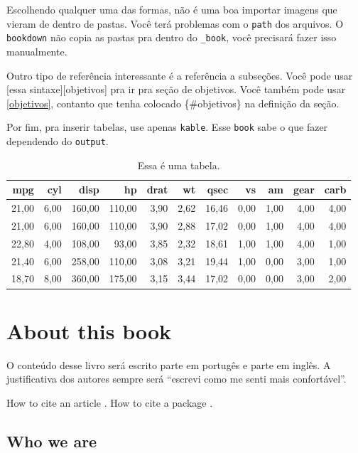 \documentclass[]{report}
\theoremstyle{definition}
\theoremstyle{definition}
\theoremstyle{definition}
\theoremstyle{remark}
\begin{document}
Escolhendo qualquer uma das formas, não é uma boa importar imagens que
vieram de dentro de pastas. Você terá problemas com o \texttt{path} dos
arquivos. O \texttt{bookdown} não copia as pastas pra dentro do
\texttt{\_book}, você precisará fazer isso manualmente.

Outro tipo de referência interessante é a referência a subseções. Você
pode usar {[}essa sintaxe{]}{[}objetivos{]} pra ir pra seção de
objetivos. Você também pode usar \ref{objetivos}, contanto que tenha
colocado \{\#objetivos\} na definição da seção.

Por fim, pra inserir tabelas, use apenas \texttt{kable}. Esse
\texttt{book} sabe o que fazer dependendo do \texttt{output}.

\begin{table}[H]
\centering
\begin{tabular}{rrrrrrrrrrr}
  \hline
mpg & cyl & disp & hp & drat & wt & qsec & vs & am & gear & carb \\ 
  \hline
21,00 & 6,00 & 160,00 & 110,00 & 3,90 & 2,62 & 16,46 & 0,00 & 1,00 & 4,00 & 4,00 \\ 
  21,00 & 6,00 & 160,00 & 110,00 & 3,90 & 2,88 & 17,02 & 0,00 & 1,00 & 4,00 & 4,00 \\ 
  22,80 & 4,00 & 108,00 & 93,00 & 3,85 & 2,32 & 18,61 & 1,00 & 1,00 & 4,00 & 1,00 \\ 
  21,40 & 6,00 & 258,00 & 110,00 & 3,08 & 3,21 & 19,44 & 1,00 & 0,00 & 3,00 & 1,00 \\ 
  18,70 & 8,00 & 360,00 & 175,00 & 3,15 & 3,44 & 17,02 & 0,00 & 0,00 & 3,00 & 2,00 \\ 
   \hline
\end{tabular}
\caption{Essa é uma tabela.} 
\end{table}

\chapter{About this book}\label{about-this-book}

O conteúdo desse livro será escrito parte em portugês e parte em inglês.
A justificativa dos autores sempre será ``escrevi como me senti mais
confortável''.

How to cite an article \citep{Weinstein1997}. How to cite a package
\citep{R-bookdown}.

\section{Who we are}\label{who-we-are}
\end{document}
